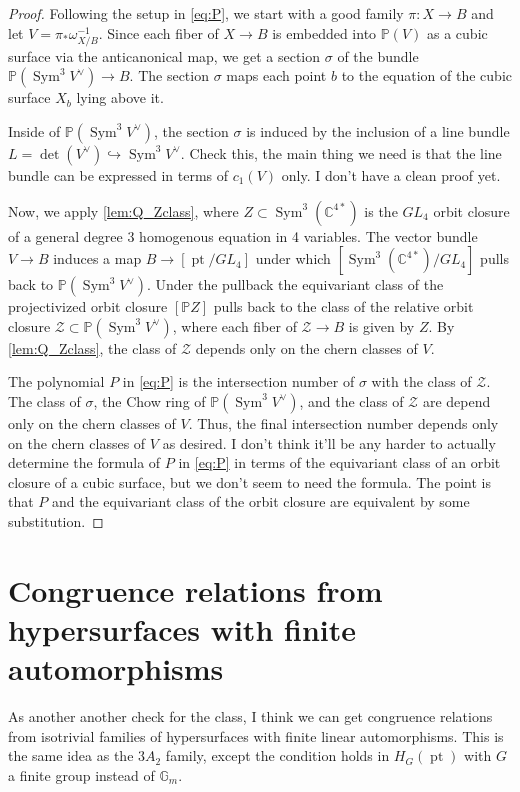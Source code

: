 \documentclass[12 pt]{amsart}
\newcommand{\<}{\left\langle}
\renewcommand{\>}{\right\rangle}
\begin{document}
\begin{proof}
Following the setup in \eqref{eq:P}, we start with a good family $\pi: X\to B$ and let $V=\pi_{*}\omega_{X/B}^{-1}$. Since each fiber of $X\to B$ is embedded into $\mathbb{P}(V)$ as a cubic surface via the anticanonical map, we get a section $\sigma$ of the bundle $\mathbb{P}(\operatorname{Sym}^3 V^{\vee})\to B$. The section $\sigma$ maps each point $b$ to the equation of the cubic surface $X_b$ lying above it.

Inside of $\mathbb{P}(\operatorname{Sym}^3 V^{\vee})$, the section $\sigma$ is induced by the inclusion of a line bundle $L=\det(V^{\vee})\hookrightarrow \operatorname{Sym}^3 V^{\vee}$. {\color{red} Check this, the main thing we need is that the line bundle can be expressed in terms of $c_1(V)$ only. I don't have a clean proof yet.}

Now, we apply \autoref{lem:Q_Zclass}, where $Z\subset \operatorname{Sym}^3(\mathbb{C}^{4\ast})$ is the $GL_4$ orbit closure of a general degree 3 homogenous equation in 4 variables. The vector bundle $V\to B$ induces a map $B\to [\operatorname{pt}/GL_4]$ under which $[\operatorname{Sym}^3(\mathbb{C}^{4\ast})/GL_4]$ pulls back to $\mathbb{P}(\operatorname{Sym}^3 V^{\vee})$. Under the pullback the equivariant class of the projectivized orbit closure $[\mathbb{P}Z]$ pulls back to the class of the relative orbit closure $\mathcal{Z}\subset \mathbb{P}(\operatorname{Sym}^3 V^{\vee})$, where each fiber of $\mathcal{Z}\to B$ is given by $Z$. By \autoref{lem:Q_Zclass}, the class of $\mathcal{Z}$ depends only on the chern classes of $V$. 

The polynomial $P$ in \eqref{eq:P} is the intersection number of $\sigma$ with the class of $\mathcal{Z}$. The class of $\sigma$, the Chow ring of $\mathbb{P}(\operatorname{Sym}^3 V^{\vee})$, and the class of $\mathcal{Z}$ are depend only on the chern classes of $V$. Thus, the final intersection number depends only on the chern classes of $V$ as desired. 
{\color{red} I don't think it'll be any harder to actually determine the formula of $P$ in \eqref{eq:P} in terms of the equivariant class of an orbit closure of a cubic surface, but we don't seem to need the formula. The point is that $P$ and the equivariant class of the orbit closure are equivalent by some substitution.}
\end{proof}

\section{Congruence relations from hypersurfaces with finite automorphisms}
As another another check for the class, I think we can get congruence relations from isotrivial families of hypersurfaces with finite linear automorphisms. This is the same idea as the $3A_2$ family, except the condition holds in $H_{G}(\operatorname{pt})$ with $G$ a finite group instead of $\mathbb{G}_m$. 
\end{document}
